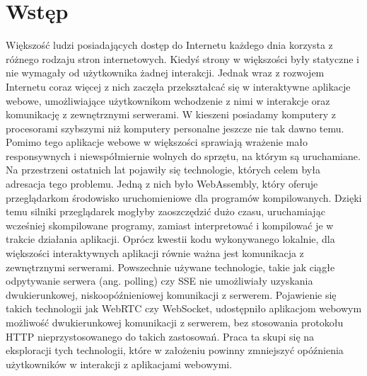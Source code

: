 \documentclass[language=polish,type=master]{aghmodern}
\author{Piotr Szczygieł}
\date{2022}
\begin{document}
\frontmatter
\maketitle

\setcounter{tocdepth}{1}
\tableofcontents

\mainmatter

\onehalfspacing

\chapter{Wstęp}
Większość ludzi posiadających dostęp do Internetu każdego dnia korzysta z różnego rodzaju stron internetowych.
Kiedyś strony w większości były statyczne i nie wymagały od użytkownika żadnej interakcji.
Jednak wraz z rozwojem Internetu coraz więcej z nich zaczęła przekształcać się w interaktywne aplikacje webowe, umożliwiające użytkownikom wchodzenie z nimi w interakcje oraz komunikację z zewnętrznymi serwerami.
W kieszeni posiadamy komputery z procesorami szybszymi niż komputery personalne jeszcze nie tak dawno temu.
Pomimo tego aplikacje webowe w większości sprawiają wrażenie mało responsywnych i niewspółmiernie wolnych do sprzętu, na którym są uruchamiane.
Na przestrzeni ostatnich lat pojawiły się technologie, których celem była adresacja tego problemu.
Jedną z nich było WebAssembly, który oferuje przeglądarkom środowisko uruchomieniowe dla programów kompilowanych.
Dzięki temu silniki przeglądarek mogłyby zaoszczędzić dużo czasu, uruchamiając wcześniej skompilowane programy, zamiast interpretować i kompilować je w trakcie działania aplikacji.
Oprócz kwestii kodu wykonywanego lokalnie, dla większości interaktywnych aplikacji równie ważna jest komunikacja z zewnętrznymi serwerami.
Powszechnie używane technologie, takie jak ciągłe odpytywanie serwera (ang. polling) czy SSE\footnotemark{} nie umożliwiały uzyskania dwukierunkowej, niskoopóźnieniowej komunikacji z serwerem.
Pojawienie się takich technologii jak WebRTC czy WebSocket, udostępniło aplikacjom webowym możliwość dwukierunkowej komunikacji z serwerem, bez stosowania protokołu HTTP nieprzystosowanego do takich zastosowań.
Praca ta skupi się na eksploracji tych technologii, które w założeniu powinny zmniejszyć opóźnienia użytkowników w interakcji z aplikacjami webowymi.
\end{document}
